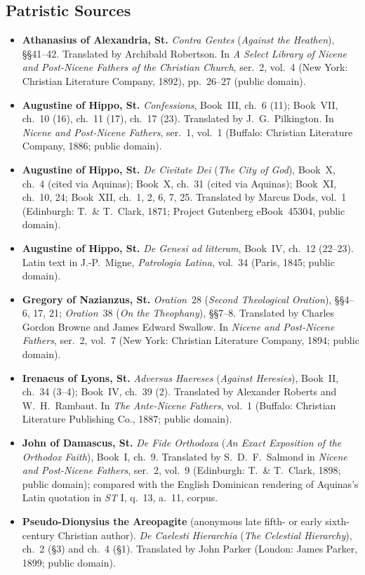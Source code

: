 \subsection*{Patristic Sources}

\begin{itemize}
\item \textbf{Athanasius of Alexandria, St.} \emph{Contra Gentes} (\emph{Against the Heathen}), \S\S41--42. Translated by Archibald Robertson. In \emph{A Select Library of Nicene and Post-Nicene Fathers of the Christian Church}, ser.~2, vol.~4 (New York: Christian Literature Company, 1892), pp.~26--27 (public domain).
\item \textbf{Augustine of Hippo, St.} \emph{Confessions}, Book~III, ch.~6 (11); Book~VII, ch.~10 (16), ch.~11 (17), ch.~17 (23). Translated by J.\ G.\ Pilkington. In \emph{Nicene and Post-Nicene Fathers}, ser.~1, vol.~1 (Buffalo: Christian Literature Company, 1886; public domain).
\item \textbf{Augustine of Hippo, St.} \emph{De Civitate Dei} (\emph{The City of God}), Book~X, ch.~4 (cited via Aquinas); Book~X, ch.~31 (cited via Aquinas); Book~XI, ch.~10, 24; Book~XII, ch.~1, 2, 6, 7, 25. Translated by Marcus Dods, vol.~1 (Edinburgh: T.\ \& T.\ Clark, 1871; Project Gutenberg eBook~45304, public domain).
\item \textbf{Augustine of Hippo, St.} \emph{De Genesi ad litteram}, Book~IV, ch.~12 (22--23). Latin text in J.-P.\ Migne, \emph{Patrologia Latina}, vol.~34 (Paris, 1845; public domain).
\item \textbf{Gregory of Nazianzus, St.} \emph{Oration}~28 (\emph{Second Theological Oration}), \S\S4--6, 17, 21; \emph{Oration}~38 (\emph{On the Theophany}), \S\S7--8. Translated by Charles Gordon Browne and James Edward Swallow. In \emph{Nicene and Post-Nicene Fathers}, ser.~2, vol.~7 (New York: Christian Literature Company, 1894; public domain).
\item \textbf{Irenaeus of Lyons, St.} \emph{Adversus Haereses} (\emph{Against Heresies}), Book~II, ch.~34 (3--4); Book~IV, ch.~39 (2). Translated by Alexander Roberts and W.\ H.\ Rambaut. In \emph{The Ante-Nicene Fathers}, vol.~1 (Buffalo: Christian Literature Publishing Co., 1887; public domain).
\item \textbf{John of Damascus, St.} \emph{De Fide Orthodoxa} (\emph{An Exact Exposition of the Orthodox Faith}), Book~I, ch.~9. Translated by S.\ D.\ F.\ Salmond in \emph{Nicene and Post-Nicene Fathers}, ser.~2, vol.~9 (Edinburgh: T.\ \& T.\ Clark, 1898; public domain); compared with the English Dominican rendering of Aquinas's Latin quotation in \emph{ST} I, q.~13, a.~11, corpus.
\item \textbf{Pseudo-Dionysius the Areopagite} (anonymous late fifth- or early sixth-century Christian author). \emph{De Caelesti Hierarchia} (\emph{The Celestial Hierarchy}), ch.~2 (\S3) and ch.~4 (\S1). Translated by John Parker (London: James Parker, 1899; public domain).
\end{itemize}

